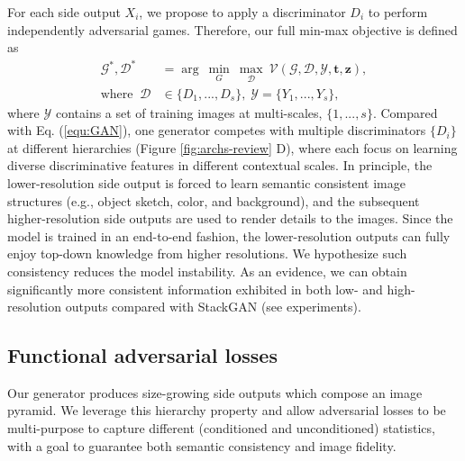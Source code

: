 \documentclass[10pt,twocolumn,letterpaper]{article}
\begin{document}
For each side output $X_i$, we propose to apply a discriminator $D_i$ to perform independently adversarial games. Therefore, our full min-max objective is defined as 
\begin{equation}
\label{equ:optim}
\begin{split}
  \mathcal{G}^*, \mathcal{D}^*&  =  \arg~\underset{G}{\min}\ \underset{\mathcal{D}}{\max}~ \mathcal{V}(\mathcal{G},\mathcal{D}, \mathcal{Y}, \bm t, \bm z), \\
  \text{where} \;\;	 \mathcal{D} & \in  \{D_1, ..., D_s\}, \; \mathcal{Y} = \{Y_1, ..., Y_s\},
\end{split}
\end{equation}
where $ \mathcal{Y}$ contains a set of training images at multi-scales, $\{1,...,s\}$.
Compared with Eq. (\ref{equ:GAN}), one generator competes with multiple discriminators  $\{D_i\}$ at different hierarchies (Figure \ref{fig:archs-review} D), where each focus on learning diverse discriminative features in different contextual scales.
In principle, the lower-resolution side output is forced to learn semantic consistent image structures (e.g., object sketch, color, and background), and the subsequent higher-resolution side outputs are used to render details to the images. Since the model is trained in an end-to-end fashion, the lower-resolution outputs can fully enjoy top-down knowledge from higher resolutions. We hypothesize such consistency reduces the model instability.
As an evidence, we can obtain significantly more consistent information exhibited in both low- and high-resolution outputs compared with StackGAN (see experiments). 


\subsection{Functional adversarial losses}
Our generator produces size-growing side outputs which compose an image pyramid. 
We leverage this hierarchy property and allow adversarial losses to be multi-purpose to capture different (conditioned and unconditioned) statistics, with a goal to guarantee both semantic consistency and image fidelity. 
\end{document}
